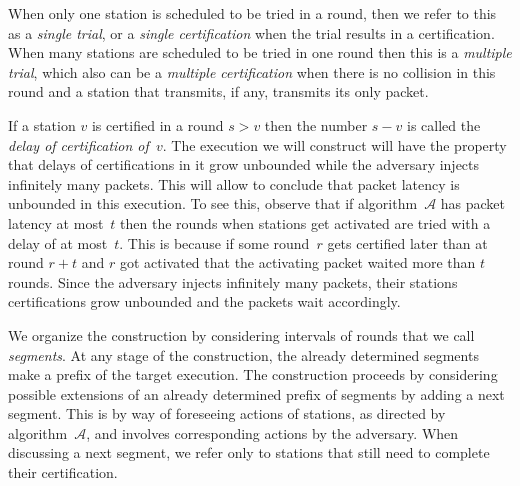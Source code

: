 \documentclass[11pt]{article}
\newcommand{\cA}{{\mathcal A}}
\begin{document}
When only one station is scheduled to be tried in a round, then we refer to this as a \emph{single trial}, or a \emph{single certification} when the trial results in a certification.
When many stations are scheduled to be tried in one round then this is a \emph{multiple trial}, which also can be a \emph{multiple certification} when there is no collision in this round and a station that transmits, if any, transmits its only packet.


If a station $v$ is certified in a round $s > v$ then the number $s-v$ is called the \emph{delay of certification of~$v$}.
The execution we will construct will have the property that delays of certifications in it grow unbounded while the adversary injects infinitely many packets.
This will allow to conclude that packet latency is unbounded in this execution.
To see this, observe that if algorithm~$\cA$ has packet latency at most~$t$  then the rounds when stations get activated are tried with a delay of at most~$t$. 
This is because if some round~$r$ gets certified later than at round $r+t$ and $r$ got activated that the activating packet waited more than $t$ rounds.
Since the adversary injects infinitely many packets, their stations certifications grow unbounded and the packets wait accordingly.

We organize the construction by considering intervals of rounds that we call \emph{segments}. At any stage of the construction, the already determined segments make a prefix  of the target execution.
The construction proceeds by considering  possible extensions of an already determined prefix of segments by adding a next segment.
This is by way of foreseeing actions of stations, as directed by  algorithm~$\cA$, and involves corresponding actions by the adversary. 
When discussing a next segment, we refer only to stations that still need to complete their certification.
\end{document}
